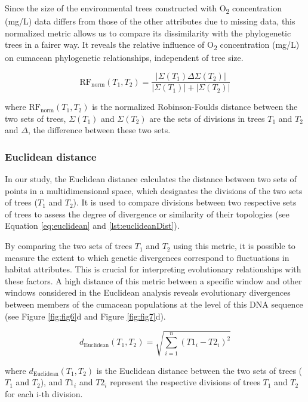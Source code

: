 Since the size of the environmental trees constructed with O\textsubscript{2} concentration (mg/L) data differs from those of the other attributes due to missing data, this normalized metric allows us to compare its dissimilarity with the phylogenetic trees in a fairer way. It reveals the relative influence of O\textsubscript{2} concentration (mg/L) on cumacean phylogenetic relationships, independent of tree size.

\begin{equation}\label{eq:rf_norm}
    \text{RF}_{\text{norm}}(T_1, T_2) = \frac{| \Sigma(T_1) \Delta \Sigma(T_2) |}{| \Sigma(T_1) | + | \Sigma(T_2) |}
\end{equation}

where $ \text{RF}_{\text{norm}}(T_1, T_2)$ is the normalized Robinson-Foulds distance between the two sets of trees, $\Sigma(T_1)$ and $\Sigma(T_2)$ are the sets of divisions in trees $T_1$ and $T_2$ and $ \Delta $, the difference between these two sets.

\subsubsection{Euclidean distance}\label{euclidean}
In our study, the Euclidean distance calculates the distance between two sets of points in a multidimensional space, which designates the divisions of the two sets of trees ($T_1$ and $T_2$). It is used to compare divisions between two respective sets of trees to assess the degree of divergence or similarity of their topologies (see Equation \eqref{eq:euclidean} and \autoref{lst:euclideanDist}).

By comparing the two sets of trees $T_1$ and $T_2$ using this metric, it is possible to measure the extent to which genetic divergences correspond to fluctuations in habitat attributes. This is crucial for interpreting evolutionary relationships with these factors. A high distance of this metric between a specific window and other windows considered in the Euclidean analysis reveals evolutionary divergences between members of the cumacean populations at the level of this DNA sequence (see Figure \ref{fig:fig6}d and Figure \ref{fig:fig7}d). 

\begin{equation}\label{eq:euclidean}
    d_{\text{Euclidean}}(T_1, T_2) = \sqrt{\sum_{i=1}^{n} (T1_i - T2_i)^2}
\end{equation}

where $ d_{\text{Euclidean}}(T_1, T_2)$ is the Euclidean distance between the two sets of trees ($T_1$ and $T_2$), and $T1_i$ and $T2_i$ represent the respective divisions of trees $T_1$ and $T_2$ for each i-th division.

